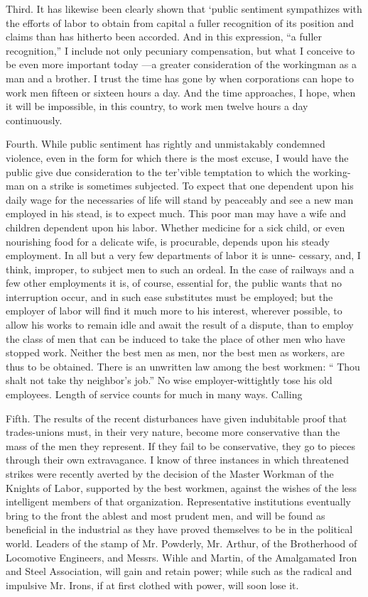 \documentclass[11pt,openany]{book}
\begin{document}
Third. It has likewise been clearly shown that `public sentiment sympathizes with the efforts of labor to obtain from capital a fuller recognition of its position and claims than has hitherto been accorded. And in this expression, ``a fuller recognition,'' I include not only pecuniary compensation, but what I conceive to be even more important today ---a greater consideration of the workingman as a man and a brother. I trust the time has gone by when corporations can hope to work men fifteen or sixteen hours a day. And the time approaches, I hope, when it will be impossible, in this country, to work men twelve hours a day continuously.

Fourth. While public sentiment has rightly and unmistakably condemned violence, even in the form for which there is the most excuse, I would have the public give due consideration to the ter'vible temptation to which the working-man on a strike is sometimes subjected. To expect that one dependent upon his daily wage for the necessaries of life will stand by peaceably and see a new man  employed in his stead, is to expect much. This poor man may have a wife and children dependent upon his labor. Whether medicine for a sick child, or even nourishing food for a delicate wife, is procurable, depends upon his steady employment. In all but a very few departments of labor it is unne- cessary, and, I think, improper, to subject men to such an ordeal. In the case of railways and a few other employments it is, of course, essential for, the public wants that no interruption occur, and in such ease substitutes must be employed; but the employer of labor will find it much more to his interest, wherever possible, to allow his works to remain idle and await the result of a dispute, than to employ the class of men that can be induced to take the place of other men who have stopped work. Neither the best men as men, nor the best men as workers, are thus to be obtained. There is an unwritten law among the best workmen: `` Thou shalt not take thy neighbor's job.'' No wise employer-wittightly tose his old employees. Length of service counts for much in many ways. Calling

Fifth. The results of the recent disturbances have given indubitable proof that trades-unions must, in their very nature, become more conservative than the mass of the men they represent. If they fail to be conservative, they go to pieces through their own extravagance. I know of three instances in which threatened strikes were recently averted by the decision of the Master Workman of the Knights of Labor, supported by the best workmen, against the wishes of the less intelligent members of that organization. Representative institutions eventually bring to the front the ablest and most prudent men, and will be found as beneficial in the industrial as they have proved themselves to be in the political world. Leaders of the stamp of Mr. Powderly, Mr. Arthur, of the Brotherhood of Locomotive Engineers, and Messrs. Wihle and Martin, of the Amalgamated Iron and Steel Association, will gain and retain power; while such as the radical and impulsive Mr. Irons, if at first clothed with power, will soon lose it.
\end{document}
